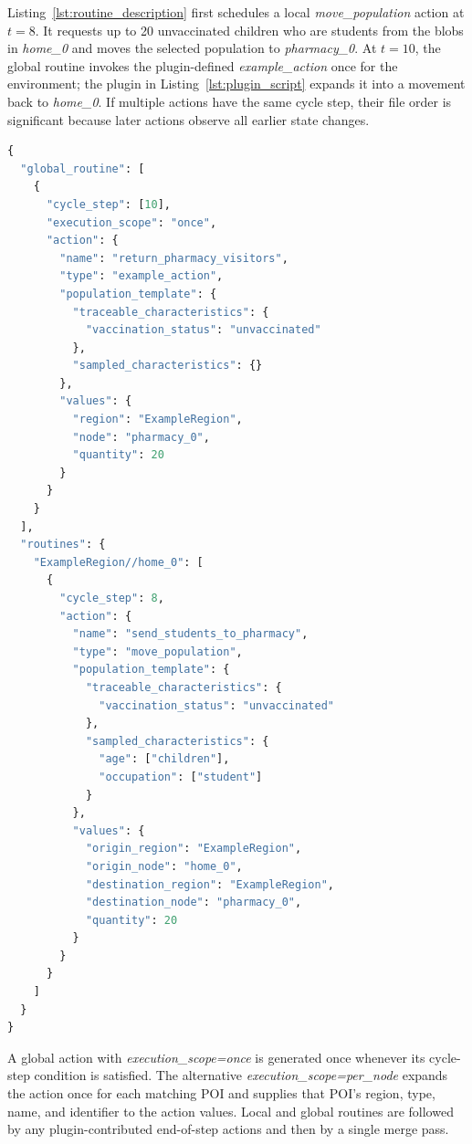 Listing~\ref{lst:routine_description} first schedules a local
\textit{move\_population} action at $t=8$. It requests up to 20 unvaccinated
children who are students from the blobs in \textit{home\_0} and moves the
selected population to \textit{pharmacy\_0}. At $t=10$, the global routine
invokes the plugin-defined \textit{example\_action} once for the environment;
the plugin in Listing~\ref{lst:plugin_script} expands it into a movement back
to \textit{home\_0}. If multiple actions have the same cycle step, their file
order is significant because later actions observe all earlier state changes.

\begin{lstlisting}[language={Python},
caption={Example of ordered local and global routine inputs.},
captionpos=b, label={lst:routine_description}, basicstyle=\scriptsize]
{
  "global_routine": [
    {
      "cycle_step": [10],
      "execution_scope": "once",
      "action": {
        "name": "return_pharmacy_visitors",
        "type": "example_action",
        "population_template": {
          "traceable_characteristics": {
            "vaccination_status": "unvaccinated"
          },
          "sampled_characteristics": {}
        },
        "values": {
          "region": "ExampleRegion",
          "node": "pharmacy_0",
          "quantity": 20
        }
      }
    }
  ],
  "routines": {
    "ExampleRegion//home_0": [
      {
        "cycle_step": 8,
        "action": {
          "name": "send_students_to_pharmacy",
          "type": "move_population",
          "population_template": {
            "traceable_characteristics": {
              "vaccination_status": "unvaccinated"
            },
            "sampled_characteristics": {
              "age": ["children"],
              "occupation": ["student"]
            }
          },
          "values": {
            "origin_region": "ExampleRegion",
            "origin_node": "home_0",
            "destination_region": "ExampleRegion",
            "destination_node": "pharmacy_0",
            "quantity": 20
          }
        }
      }
    ]
  }
}
\end{lstlisting}

A global action with \textit{execution\_scope=once} is generated once whenever
its cycle-step condition is satisfied. The alternative
\textit{execution\_scope=per\_node} expands the action once for each matching
POI and supplies that POI's region, type, name, and identifier to the action
values. Local and global routines are followed by any plugin-contributed
end-of-step actions and then by a single merge pass.


